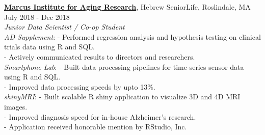 \documentclass[a4paper]{article}
\newcommand{\mybullet}{
	\indent 
  \textbullet \hspace*{2mm}
}
\begin{document}
  \noindent
  \textbf{\href{https://www.marcusinstituteforaging.org/}{Marcus Institute for Aging Research}}, 
  Hebrew SeniorLife, Roslindale, MA 
  \hfill July 2018 - Dec 2018 \\
        \textit{Junior Data Scientist / Co-op Student} \\
        \mybullet \textit{AD Supplement}: 
        \hspace*{3.7 mm} - Performed regression analysis and hypothesis testing
        on clinical trials data using R and SQL. \\
        \hspace*{37.5 mm} - Actively communicated results to directors and researchers.  \\
        \mybullet \textit{Smartphone Lab}: 
        \hspace* {2.3 mm} - Built data processing pipelines for time-series sensor data using R and SQL. \\
        \hspace*{37.5 mm} - Improved data processing speeds by upto 13\%. \\ 
        \mybullet \textit{shinyMRI}: 
        \hspace* {12.7 mm} - Built scalable R shiny application to visualize 3D and 4D MRI images. \\
        \hspace*{37.5 mm} - Improved diagnosis speed for in-house Alzheimer's research. \\
        \hspace*{37.5 mm} - Application received honorable mention by RStudio, Inc. \\
        
	
\end{document}
